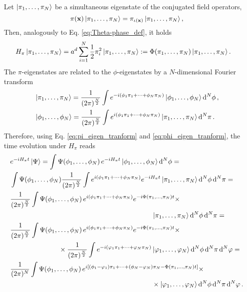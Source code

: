 \documentclass[a4paper,10pt]{report}
\begin{document}
Let $\ket{\pi_1,\dots,\pi_N}$ be a simultaneous eigenstate of the conjugated field operators,
\begin{equation}
\pi(\mathbf{x})\ket{\pi_1,\dots,\pi_N} = \pi_{\iota(\mathbf{x})}\ket{\pi_1,\dots,\pi_N},
\end{equation}
Then, analogously to Eq. \eqref{eq:Theta-phase_def}, it holds
\begin{align}
H_\pi&\ket{\pi_1,\dots,\pi_N} = a^d\sum_{i=1}^N\frac{1}{2}\pi_i^2\ket{\pi_1,\dots,\pi_N} := \Phi(\pi_1,\dots,\pi_N)\ket{\pi_1,\dots,\pi_N}.
\end{align}
The $\pi$-eigenstates are related to the $\phi$-eigenstates by a $N$-dimensional Fourier transform
\begin{align}
\label{eq:pi_eigen_tranform}
&\ket{\pi_1,\dots,\pi_N} = \frac{1}{(2\pi)^\frac{N}{2}}\int e^{-i(\phi_1\pi_1+\dots+\phi_N\pi_N)}\ket{\phi_1,\dots,\phi_N}\dd[N]{\phi}, \\
\label{eq:phi_eigen_tranform}
&\ket{\phi_1,\dots,\phi_N} = \frac{1}{(2\pi)^\frac{N}{2}}\int e^{i(\phi_1\pi_1+\dots+\phi_N\pi_N)}\ket{\pi_1,\dots,\pi_N}\dd[N]{\pi}.
\end{align}
Therefore, using Eq. \eqref{eq:pi_eigen_tranform} and \eqref{eq:phi_eigen_tranform}, the time evolution under $H_\pi$ reads
\begin{align}
&e^{-iH_\pi t}\ket{\Psi} = \int\Psi(\phi_1,\dots,\phi_N)\,e^{-iH_\pi t}\ket{\phi_1,\dots,\phi_N}\dd[N]{\phi} = \nonumber\\
&\int\Psi(\phi_1,\dots,\phi_N)\frac{1}{(2\pi)^\frac{N}{2}}\int e^{i(\phi_1\pi_1+\dots+\phi_N\pi_N)}e^{-iH_\pi t}\ket{\pi_1,\dots,\pi_N}\dd[N]{\phi}\dd[N]{\pi} = \nonumber\\
&\frac{1}{(2\pi)^\frac{N}{2}}\int\Psi(\phi_1,\dots,\phi_N)\,e^{i(\phi_1\pi_1+\dots+\phi_N\pi_N)}e^{-i\Phi(\pi_1,\dots,\pi_N)t}\times \nonumber\\
&\hspace{7.3cm}\ket{\pi_1,\dots,\pi_N}\dd[N]{\phi}\dd[N]{\pi} = \nonumber \\
&\frac{1}{(2\pi)^\frac{N}{2}}\int\Psi(\phi_1,\dots,\phi_N)\,e^{i(\phi_1\pi_1+\dots+\phi_N\pi_N)}e^{-i\Phi(\pi_1,\dots,\pi_N)t}\times \nonumber\\
&\hspace{2.5cm}\times\frac{1}{(2\pi)^\frac{N}{2}}\int e^{-i(\varphi_1\pi_1+\dots+\varphi_N\pi_N)}\ket{\varphi_1,\dots,\varphi_N}\dd[N]{\phi}\dd[N]{\pi}\dd[N]{\varphi} = \nonumber\\
&\frac{1}{(2\pi)^N}\int\Psi(\phi_1,\dots,\phi_N)\,e^{i[(\phi_1-\varphi_1)\pi_1+\dots+(\phi_N-\varphi_N)\pi_N-\Phi(\pi_1,\dots,\pi_N)t]}\times\nonumber\\
&\hspace{7.3cm}\times\ket{\varphi_1,\dots,\varphi_N}\dd[N]{\phi}\dd[N]{\pi}\dd[N]{\varphi}.
\label{eq:pi_evolution}
\end{align}
\end{document}
